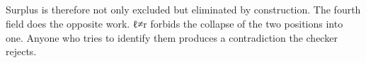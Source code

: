 \documentclass[11pt,a4paper]{book}
\def\texttt#1{#1}%
\begin{document}
\begin{code}%
\>[0]\AgdaSpace{}%
\AgdaSymbol{:}\<%
\\
\>[0][@{}l@{\AgdaIndent{0}}]%
\>[2]\AgdaSymbol{(}\AgdaSpace{}%
\AgdaSymbol{:}\AgdaSpace{}%
\AgdaSymbol{)}\AgdaSpace{}%
\<%
\\
%
\>[2]\AgdaSymbol{\{}\AgdaSpace{}%
\AgdaSymbol{:}\AgdaSpace{}%
\AgdaSpace{}%
\AgdaSpace{}%
\AgdaSpace{}%
\AgdaSymbol{\}}\AgdaSpace{}%
\<%
\\
%
\>[2]\AgdaSpace{}%
\AgdaSymbol{(}\AgdaSpace{}%
\AgdaSymbol{)}\AgdaSpace{}%
\<%
\\
%
\>[2]\AgdaSpace{}%
\AgdaSymbol{(}\AgdaSpace{}%
\AgdaSymbol{)}\AgdaSpace{}%
\<%
\\
%
\>[2]\AgdaSymbol{(}\AgdaSpace{}%
\AgdaSymbol{:}\AgdaSpace{}%
\AgdaSpace{}%
\AgdaSymbol{)}\AgdaSpace{}%
\<%
\\
%
\>[2]\AgdaSpace{}%
\<%
\\
\>[0]\AgdaSpace{}%
\AgdaSpace{}%
\AgdaSymbol{\{}\AgdaSymbol{\}}\AgdaSpace{}%
\AgdaSpace{}%
\AgdaSpace{}%
\AgdaSpace{}%
\AgdaSpace{}%
\AgdaSpace{}%
\AgdaSpace{}%
\<%
\\
\>[0]\AgdaSpace{}%
\AgdaSymbol{|}\AgdaSpace{}%
\AgdaSpace{}%
\AgdaSpace{}%
\AgdaSymbol{=}\AgdaSpace{}%
\AgdaSpace{}%
\AgdaSpace{}%
\AgdaSymbol{(}\AgdaSpace{}%
\AgdaSymbol{)}\AgdaSpace{}%
\<%
\\
\>[0]\AgdaSpace{}%
\AgdaSymbol{|}\AgdaSpace{}%
\AgdaSpace{}%
\AgdaSpace{}%
\AgdaSymbol{=}\AgdaSpace{}%
\AgdaSpace{}%
\AgdaSpace{}%
\AgdaSymbol{(}\AgdaSpace{}%
\AgdaSymbol{)}\AgdaSpace{}%
\<%
\end{code}

Surplus is therefore not only excluded but eliminated by construction. The
fourth field does the opposite work. \texttt{ℓ≠r} forbids the collapse of
the two positions into one. Anyone who tries to identify them produces a
contradiction the checker rejects.
\end{document}
